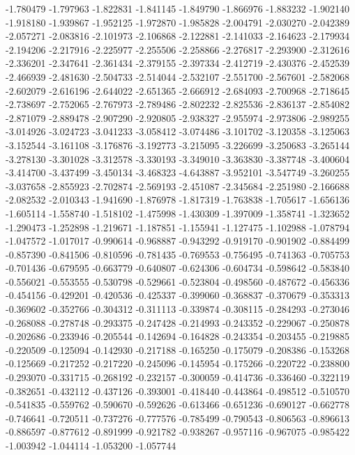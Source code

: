 -1.780479
-1.797963
-1.822831
-1.841145
-1.849790
-1.866976
-1.883232
-1.902140
-1.918180
-1.939867
-1.952125
-1.972870
-1.985828
-2.004791
-2.030270
-2.042389
-2.057271
-2.083816
-2.101973
-2.106868
-2.122881
-2.141033
-2.164623
-2.179934
-2.194206
-2.217916
-2.225977
-2.255506
-2.258866
-2.276817
-2.293900
-2.312616
-2.336201
-2.347641
-2.361434
-2.379155
-2.397334
-2.412719
-2.430376
-2.452539
-2.466939
-2.481630
-2.504733
-2.514044
-2.532107
-2.551700
-2.567601
-2.582068
-2.602079
-2.616196
-2.644022
-2.651365
-2.666912
-2.684093
-2.700968
-2.718645
-2.738697
-2.752065
-2.767973
-2.789486
-2.802232
-2.825536
-2.836137
-2.854082
-2.871079
-2.889478
-2.907290
-2.920805
-2.938327
-2.955974
-2.973806
-2.989255
-3.014926
-3.024723
-3.041233
-3.058412
-3.074486
-3.101702
-3.120358
-3.125063
-3.152544
-3.161108
-3.176876
-3.192773
-3.215095
-3.226699
-3.250683
-3.265144
-3.278130
-3.301028
-3.312578
-3.330193
-3.349010
-3.363830
-3.387748
-3.400604
-3.414700
-3.437499
-3.450134
-3.468323
-4.643887
-3.952101
-3.547749
-3.260255
-3.037658
-2.855923
-2.702874
-2.569193
-2.451087
-2.345684
-2.251980
-2.166688
-2.082532
-2.010343
-1.941690
-1.876978
-1.817319
-1.763838
-1.705617
-1.656136
-1.605114
-1.558740
-1.518102
-1.475998
-1.430309
-1.397009
-1.358741
-1.323652
-1.290473
-1.252898
-1.219671
-1.187851
-1.155941
-1.127475
-1.102988
-1.078794
-1.047572
-1.017017
-0.990614
-0.968887
-0.943292
-0.919170
-0.901902
-0.884499
-0.857390
-0.841506
-0.810596
-0.781435
-0.769553
-0.756495
-0.741363
-0.705753
-0.701436
-0.679595
-0.663779
-0.640807
-0.624306
-0.604734
-0.598642
-0.583840
-0.556021
-0.553555
-0.530798
-0.529661
-0.523804
-0.498560
-0.487672
-0.456336
-0.454156
-0.429201
-0.420536
-0.425337
-0.399060
-0.368837
-0.370679
-0.353313
-0.369602
-0.352766
-0.304312
-0.311113
-0.339874
-0.308115
-0.284293
-0.273046
-0.268088
-0.278748
-0.293375
-0.247428
-0.214993
-0.243352
-0.229067
-0.250878
-0.202686
-0.233946
-0.205544
-0.142694
-0.164828
-0.243354
-0.203455
-0.219885
-0.220509
-0.125094
-0.142930
-0.217188
-0.165250
-0.175079
-0.208386
-0.153268
-0.125669
-0.217252
-0.217220
-0.245096
-0.145954
-0.175266
-0.220722
-0.238800
-0.293070
-0.331715
-0.268192
-0.232157
-0.300059
-0.414736
-0.336460
-0.322119
-0.382651
-0.432112
-0.437126
-0.393001
-0.418440
-0.443864
-0.498512
-0.510570
-0.541835
-0.559762
-0.590670
-0.592626
-0.613466
-0.651236
-0.690127
-0.662778
-0.746641
-0.720511
-0.737276
-0.777576
-0.785499
-0.790543
-0.806563
-0.896613
-0.886597
-0.877612
-0.891999
-0.921782
-0.938267
-0.957116
-0.967075
-0.985422
-1.003942
-1.044114
-1.053200
-1.057744

